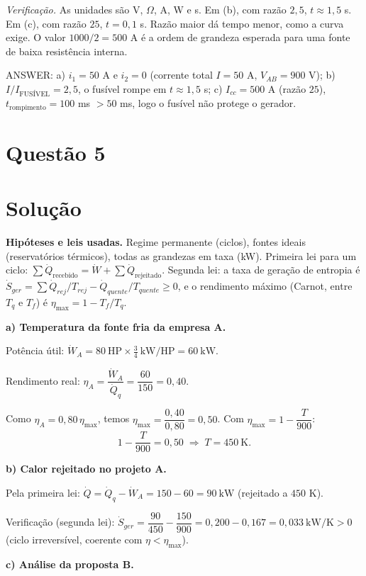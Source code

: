 \documentclass{article}%
\begin{document}
\emph{Verificação.} As unidades são V, $\Omega$, A, W e s. Em (b), com razão $2{,}5$, $t\approx1{,}5$ s. Em (c), com razão $25$, $t=0{,}1$ s. Razão maior dá tempo menor, como a curva exige. O valor $1000/2=500$ A é a ordem de grandeza esperada para uma fonte de baixa resistência interna.

ANSWER: a) $i_1=50$ A e $i_2=0$ (corrente total $I=50$ A, $V_{AB}=900$ V); b) $I/I_{\text{FUSÍVEL}}=2{,}5$, o fusível rompe em $t\approx1{,}5$ s; c) $I_{cc}=500$ A (razão $25$), $t_{\text{rompimento}}=100$ ms $>50$ ms, logo o fusível não protege o gerador.%
\newpage%
\section*{Questão 5}

\section*{Solução}

\textbf{Hipóteses e leis usadas.} Regime permanente (ciclos), fontes ideais (reservatórios térmicos), todas as grandezas em taxa (kW). Primeira lei para um ciclo: $\sum \dot Q_{\text{recebido}} = \dot W + \sum \dot Q_{\text{rejeitado}}$. Segunda lei: a taxa de geração de entropia é $\dot S_{ger} = \sum \dot Q_{rej}/T_{rej} - \dot Q_{quente}/T_{quente} \ge 0$, e o rendimento máximo (Carnot, entre $T_q$ e $T_f$) é $\eta_{\max}=1-T_f/T_q$.

\medskip
\textbf{a) Temperatura da fonte fria da empresa A.}

Potência útil: $\dot W_A = 80\ \text{HP}\times \tfrac34\ \text{kW/HP}=60\ \text{kW}$.

Rendimento real: $\eta_A=\dfrac{\dot W_A}{\dot Q_q}=\dfrac{60}{150}=0{,}40$.

Como $\eta_A = 0{,}80\,\eta_{\max}$, temos $\eta_{\max}=\dfrac{0{,}40}{0{,}80}=0{,}50$. Com $\eta_{\max}=1-\dfrac{T}{900}$:
\[
1-\frac{T}{900}=0{,}50 \;\Rightarrow\; T = 450\ \text{K}.
\]

\textbf{b) Calor rejeitado no projeto A.}

Pela primeira lei: $\dot Q = \dot Q_q-\dot W_A = 150-60 = 90\ \text{kW}$ (rejeitado a $450$ K).

Verificação (segunda lei): $\dot S_{ger}=\dfrac{90}{450}-\dfrac{150}{900}=0{,}200-0{,}167=0{,}033\ \text{kW/K}>0$ (ciclo irreversível, coerente com $\eta<\eta_{\max}$).

\medskip
\textbf{c) Análise da proposta B.}
\end{document}

